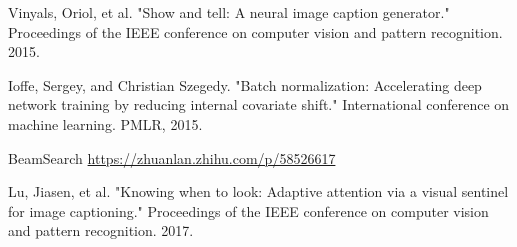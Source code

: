 \documentclass[UTF8]{ctexart}
\begin{document}
\begin{thebibliography}{8}
    Vinyals, Oriol, et al. "Show and tell: A neural image caption generator." Proceedings of the IEEE conference on computer vision and pattern recognition. 2015.

    Ioffe, Sergey, and Christian Szegedy. "Batch normalization: Accelerating deep network training by reducing internal covariate shift." International conference on machine learning. PMLR, 2015.

    BeamSearch
    \url{https://zhuanlan.zhihu.com/p/58526617}

    Lu, Jiasen, et al. "Knowing when to look: Adaptive attention via a visual sentinel for image captioning." Proceedings of the IEEE conference on computer vision and pattern recognition. 2017.


\end{thebibliography}
\end{document}
